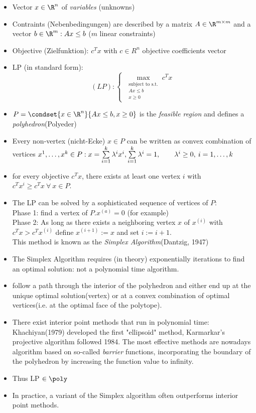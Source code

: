 \begin{itemize}
	\item Vector $x \in \R^n$ of \emph{variables} (unknowns)
	\item Contraints (Nebenbedingungen) are described by a matrix $A \in \R^{m \times m}$ and a vector $b \in \R^m: Ax\leq b$ ($m$ linear constraints)
	\item Objective (Zielfunktion): $c^Tx$ with $c \in R^n$ objective coefficients vector
	\item LP (in standard form):
	\[(LP): \begin{cases}
		\max_{\begin{matrix}\text{subject to s.t.} \\ Ax \leq b \\ x \geq 0\end{matrix}}c^Tx
		\end{cases}
	\]
	\item $P = \condset{x\in \R^n}{Ax \leq b, x\geq 0}$ is the \emph{feasible region} and defines a \emph{polyhedron}(Polyeder)
	\item Every non-vertex (nicht-Ecke) $x \in P$ can be written as convex combination of vertices $x^1,\dots,x^k \in P: \\
	x=\sum\limits_{i=1}^k \lambda^i x^i , \sum\limits_{i=1}^k \lambda^i =1, \qquad \lambda^i \geq 0, \: i=1,\dots,k$ 
	\item for every objective $c^Tx$, there exists at least one vertex $i$ with $c^Tx^i \geq c^Tx \:\forall \: x \in P$.
	\item The LP can be solved by a sophisticated sequence of vertices of $P$:\\
	Phase 1: find a vertex of $P. x^{(a)}=0$ (for example)\\
	Phase 2: As long as there exists a neighboring vertex $x$ of $x^{(i)}$ with $c^Tx > c^Tx^{(i)}$ define $x^{(i+1)}:=x$ and set $i:=i+1$.\\
	This method is known as the \emph{Simplex Algorithm}(Dantzig, 1947)
	\item The Simplex Algorithm requires (in theory) exponentially iterations to find an optimal solution: not a polynomial time algorithm.
	\item {} follow a path through the interior of the polyhedron and either end up at the unique optimal solution(vertex) or at a convex combination of optimal vertices(i.e. at the optimal face of the polytope).
	\item There exist interior point methods that run in polynomial time: Khachiyan(1979) developed the first "ellipsoid" method, Karmarkar's projective algorithm followed 1984. The most effective methods are nowadays algorithm based on so-called \emph{barrier} functions, incorporating the boundary of the polyhedron by increasing the function value to infinity.
	\item Thus LP $\in \poly$
	\item In practice, a variant of the Simplex algorithm often outperforms interior point methods.
\end{itemize}
